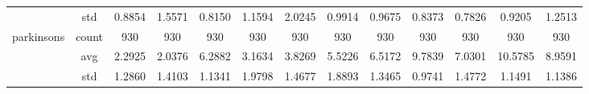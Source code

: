 \begin{table}[htbp]
{\begin{tabular}{rcccccccccccc}
                                                     & std                                    & 0.8854                                                                             & 1.5571                                                                    & 0.8150                                                                    & 1.1594                                                                    & 2.0245                                        & 0.9914                                      & 0.9675                                         & 0.8373                                         & 0.7826                                         & 0.9205                                         & 1.2513                                         \\
                  parkinsons                         & count                                  & 930                                                                                & 930                                                                       & 930                                                                       & 930                                                                       & 930                                           & 930                                         & 930                                            & 930                                            & 930                                            & 930                                            & 930                                            \\
                                                     & avg                                    & 2.2925                                                                             & \cellcolor[rgb]{ .776,  .937,  .808}\textcolor[rgb]{ 0,  .38,  0}{2.0376} & 6.2882                                                                    & 3.1634                                                                    & 3.8269                                        & 5.5226                                      & 6.5172                                         & 9.7839                                         & 7.0301                                         & 10.5785                                        & 8.9591                                         \\
                                                     & std                                    & 1.2860                                                                             & 1.4103                                                                    & 1.1341                                                                    & 1.9798                                                                    & 1.4677                                        & 1.8893                                      & 1.3465                                         & 0.9741                                         & 1.4772                                         & 1.1491                                         & 1.1386                                         \\

\end{tabular}}
\end{table}
